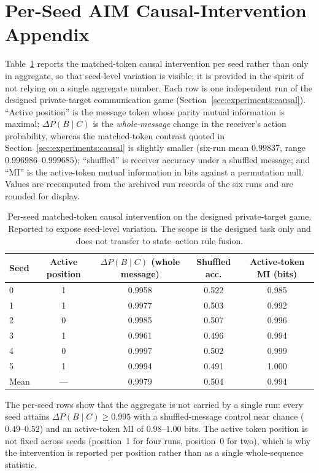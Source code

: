 \documentclass[11pt]{article}
\begin{document}



\appendix
\section{Per-Seed AIM Causal-Intervention Appendix}
\label{app:aim}

Table~\ref{tab:aim} reports the matched-token causal intervention per seed rather than only in
aggregate, so that seed-level variation is visible; it is provided in the spirit of not relying on a
single aggregate number. Each row is one independent run of the designed private-target communication
game (Section~\ref{sec:experiments:causal}). ``Active position'' is the message token whose parity
mutual information is maximal; $\Delta P(B\mid C)$ is the \emph{whole-message} change in the receiver's
action probability, whereas the matched-token contrast quoted in Section~\ref{sec:experiments:causal}
is slightly smaller (six-run mean $0.99837$, range $0.996986$--$0.999685$); ``shuffled'' is receiver
accuracy under a shuffled message; and ``MI'' is the
active-token mutual information in bits against a permutation null. Values are recomputed from the
archived run records of the six runs and are rounded for display.

\begin{table}[t]
\centering
\caption{Per-seed matched-token causal intervention on the designed private-target game. Reported to
expose seed-level variation. The scope is the designed task only and does not transfer to
state--action rule fusion.}
\label{tab:aim}
\begin{tabular}{lcccc}
\toprule
Seed & Active position & $\Delta P(B\mid C)$ (whole message) & Shuffled acc. & Active-token MI (bits) \\
\midrule
0 & 1 & 0.9958 & 0.522 & 0.985 \\
1 & 1 & 0.9977 & 0.503 & 0.992 \\
2 & 0 & 0.9985 & 0.507 & 0.996 \\
3 & 1 & 0.9961 & 0.496 & 0.994 \\
4 & 0 & 0.9997 & 0.502 & 0.999 \\
5 & 1 & 0.9994 & 0.491 & 1.000 \\
\midrule
Mean & --- & 0.9979 & 0.504 & 0.994 \\
\bottomrule
\end{tabular}
\end{table}

The per-seed rows show that the aggregate is not carried by a single run: every seed attains
$\Delta P(B\mid C)\ge 0.995$ with a shuffled-message control near chance ($0.49$--$0.52$) and an
active-token MI of $0.98$--$1.00$ bits. The active token position is not fixed across seeds
(position~1 for four runs, position~0 for two), which is why the intervention is reported per position
rather than as a single whole-sequence statistic.
\end{document}
